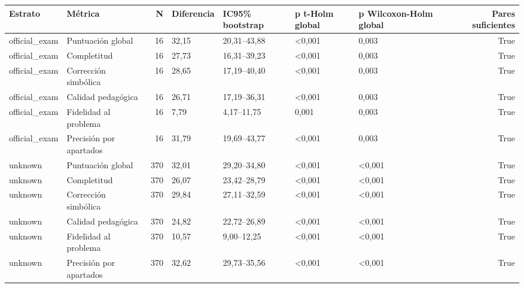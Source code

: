 \begin{tabular}{llrllllr}
\toprule
Estrato & Métrica & N & Diferencia & IC95\% bootstrap & p t-Holm global & p Wilcoxon-Holm global & Pares suficientes \\
\midrule
official\_exam & Puntuación global & 16 & 32,15 & 20,31–43,88 & <0,001 & 0,003 & True \\
official\_exam & Completitud & 16 & 27,73 & 16,31–39,23 & <0,001 & 0,003 & True \\
official\_exam & Corrección simbólica & 16 & 28,65 & 17,19–40,40 & <0,001 & 0,003 & True \\
official\_exam & Calidad pedagógica & 16 & 26,71 & 17,19–36,31 & <0,001 & 0,003 & True \\
official\_exam & Fidelidad al problema & 16 & 7,79 & 4,17–11,75 & 0,001 & 0,003 & True \\
official\_exam & Precisión por apartados & 16 & 31,79 & 19,69–43,77 & <0,001 & 0,003 & True \\
unknown & Puntuación global & 370 & 32,01 & 29,20–34,80 & <0,001 & <0,001 & True \\
unknown & Completitud & 370 & 26,07 & 23,42–28,79 & <0,001 & <0,001 & True \\
unknown & Corrección simbólica & 370 & 29,84 & 27,11–32,59 & <0,001 & <0,001 & True \\
unknown & Calidad pedagógica & 370 & 24,82 & 22,72–26,89 & <0,001 & <0,001 & True \\
unknown & Fidelidad al problema & 370 & 10,57 & 9,00–12,25 & <0,001 & <0,001 & True \\
unknown & Precisión por apartados & 370 & 32,62 & 29,73–35,56 & <0,001 & <0,001 & True \\
\bottomrule
\end{tabular}
